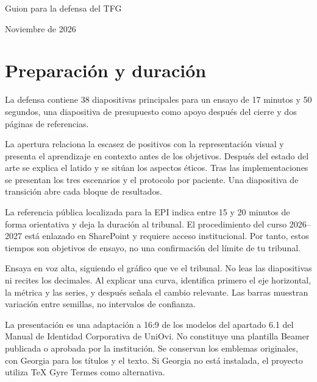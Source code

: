 \documentclass[11pt,a4paper]{article}
\begin{document}
\begin{center}{\LARGE Guion para la defensa del TFG}\par\medskip
{\large\ThesisTitle}\par\medskip\AuthorName\par Noviembre de 2026\end{center}
\section*{Preparación y duración}
La defensa contiene 38 diapositivas principales para un ensayo de 17 minutos y 50 segundos, una diapositiva de presupuesto como apoyo después del cierre y dos páginas de referencias.

La apertura relaciona la escasez de positivos con la representación visual y presenta el aprendizaje en contexto antes de los objetivos. Después del estado del arte se explica el latido y se sitúan los aspectos éticos. Tras las implementaciones se presentan los tres escenarios y el protocolo por paciente. Una diapositiva de transición abre cada bloque de resultados.

La referencia pública localizada para la EPI indica entre 15 y 20 minutos de forma orientativa y deja la duración al tribunal. El procedimiento del curso 2026--2027 está enlazado en SharePoint y requiere acceso institucional. Por tanto, estos tiempos son objetivos de ensayo, no una confirmación del límite de tu tribunal.

Ensaya en voz alta, siguiendo el gráfico que ve el tribunal. No leas las diapositivas ni recites los decimales. Al explicar una curva, identifica primero el eje horizontal, la métrica y las series, y después señala el cambio relevante. Las barras muestran variación entre semillas, no intervalos de confianza.

La presentación es una adaptación a 16:9 de los modelos del apartado 6.1 del Manual de Identidad Corporativa de UniOvi. No constituye una plantilla Beamer publicada o aprobada por la institución. Se conservan los emblemas originales, con Georgia para los títulos y el texto. Si Georgia no está instalada, el proyecto utiliza TeX Gyre Termes como alternativa.
\end{document}
